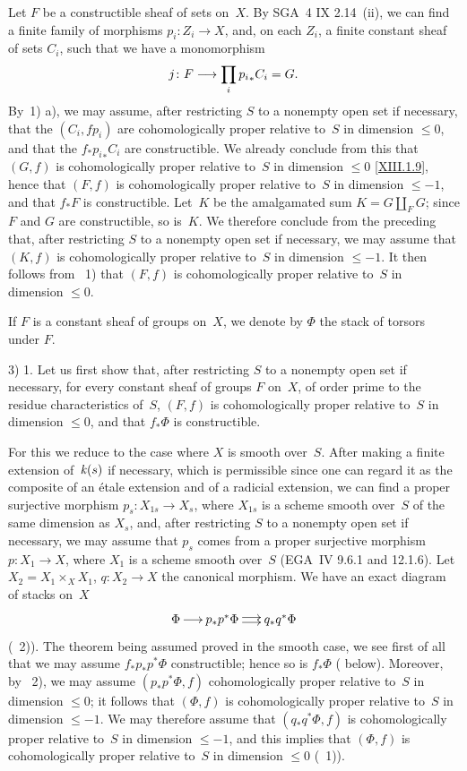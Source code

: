 Let $F$ be a constructible sheaf of sets on~$X$. By
SGA~4 IX 2.14~(ii), we can find a finite family of morphisms
$p_i \colon Z_i \to X$, and, on each $Z_i$, a finite constant sheaf of sets
$C_i$, such that we have a monomorphism
$$
j \colon F \to \prod_{i} {p_i}_* C_i =G \quoi.
$$
By~1)\kern2pt a),
we may assume, after restricting $S$ to a nonempty
open set if necessary, that the $(C_i,fp_i)$ are cohomologically proper relative
to~$S$ in dimension $\le 0$, and that the $f_*{p_i}_*C_i$ are
constructible. We already conclude from this that $(G,f)$ is
cohomologically proper relative to~$S$ in dimension $\le 0$
\eqref{XIII.1.9}, hence that $(F,f)$ is cohomologically proper
relative to~$S$ in dimension $\le -1$, and that $f_*F$ is
constructible. Let~$K$ be the amalgamated sum $K= G \coprod_{F} G$;
since $F$ and $G$ are constructible, so is~$K$. We
therefore conclude from the preceding that, after restricting
$S$ to a nonempty open set if necessary, we may assume that $(K,f)$ is
cohomologically proper relative to~$S$ in dimension $\le
-1$. It then follows from ~1) that $(F,f)$ is
cohomologically proper relative to~$S$ in dimension $\le 0$.


If $F$ is a constant sheaf of groups on~$X$, we denote by $\Phi$ the
stack of torsors under $F$.

3) 1. Let us first show that, after restricting $S$ to a
nonempty open set if necessary, for every constant sheaf of groups $F$ on~$X$,
of order prime to the residue characteristics of~$S$,
$(F,f)$ is cohomologically proper relative to~$S$ in
dimension $\le 0$, and that $f_*\Phi$ is constructible.

For this we reduce to the case where $X$ is smooth over~$S$. After
making a finite extension of~$\mathit{k}(s)$ if necessary, which is permissible since one
can regard it as the composite of an \'etale extension and
of a radicial extension, we can find a proper
surjective morphism $p_s \colon X_{1s}\to X_s$, where $X_{1s}$ is a
scheme smooth over~$S$ of the same dimension as $X_s$, and, after
restricting $S$ to a nonempty open set if necessary, we may assume that
$p_s$ comes from a proper surjective morphism $p \colon X_1 \to X$,
where $X_1$ is a scheme smooth over~$S$
(EGA~IV 9.6.1 and 12.1.6). Let $X_2=X_1 \times_X X_1$, $q \colon
X_2 \to X$ the canonical morphism. We have an exact diagram of stacks
on~$X$
$$
\xymatrix@C=.5cm{\Phi \ar[r] & p_*p^* \Phi \ar@<2pt>[r]\ar@<-2pt>[r] &
q_*q^*\Phi }
$$
(~2)). The theorem being assumed
proved in the smooth case, we see first of all that we may
assume $f_*p_*p^*\Phi$ constructible; hence so is
$f_*\Phi$ ( below). Moreover, by ~2),
we may assume $(p_*p^*\Phi,f)$ cohomologically proper
relative to~$S$ in dimension $\le 0$; it follows that
$(\Phi,f)$ is cohomologically proper relative to~$S$ in
dimension $\le -1$. We may therefore assume that $(q_*q^*\Phi,f)$ is
cohomologically proper relative to~$S$ in dimension $\le -1$,
and this implies that $(\Phi,f)$ is cohomologically proper
relative to~$S$ in dimension $\le 0$ (~1)).

